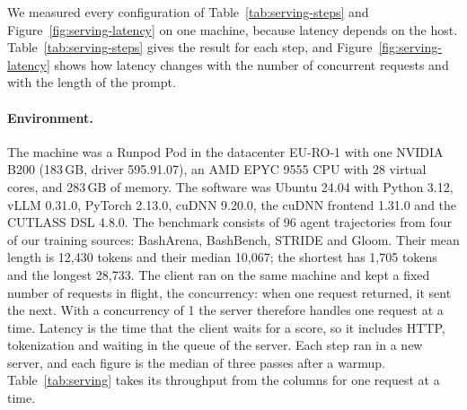 We measured every configuration of Table~\ref{tab:serving-steps} and Figure~\ref{fig:serving-latency} on one machine, because latency depends on the host.
Table~\ref{tab:serving-steps} gives the result for each step, and Figure~\ref{fig:serving-latency} shows how latency changes with the number of concurrent requests and with the length of the prompt.

\paragraph{Environment.}
The machine was a Runpod Pod in the datacenter EU-RO-1 with one NVIDIA B200 (183\,GB, driver 595.91.07), an AMD EPYC 9555 CPU with 28 virtual cores, and 283\,GB of memory.
The software was Ubuntu 24.04 with Python 3.12, vLLM 0.31.0, PyTorch 2.13.0, cuDNN 9.20.0, the cuDNN frontend 1.31.0 and the CUTLASS DSL 4.8.0.
The benchmark consists of 96 agent trajectories from four of our training sources: BashArena, BashBench, STRIDE and Gloom.
Their mean length is 12,430 tokens and their median 10,067; the shortest has 1,705 tokens and the longest 28,733.
The client ran on the same machine and kept a fixed number of requests in flight, the concurrency: when one request returned, it sent the next.
With a concurrency of 1 the server therefore handles one request at a time.
Latency is the time that the client waits for a score, so it includes HTTP, tokenization and waiting in the queue of the server.
Each step ran in a new server, and each figure is the median of three passes after a warmup.
Table~\ref{tab:serving} takes its throughput from the columns for one request at a time.

